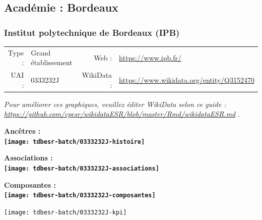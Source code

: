 \documentclass[12pt,french,]{article}
\begin{document}
\hypertarget{acaduxe9mie-bordeaux-1}{%
\subsection{Académie : Bordeaux}\label{acaduxe9mie-bordeaux-1}}

\hypertarget{institut-polytechnique-de-bordeaux-ipb}{%
\subsubsection{Institut polytechnique de Bordeaux
(IPB)}\label{institut-polytechnique-de-bordeaux-ipb}}

\begin{tabular*}{\textwidth}{rp{5cm}rl}  
\hline  
Type : & Grand établissement & Web : &\href{https://www.ipb.fr/}{https://www.ipb.fr/} \\  
UAI : & 0333232J & WikiData : & \href{https://www.wikidata.org/entity/Q3152470}{https://www.wikidata.org/entity/Q3152470} \\  
\hline  
\end{tabular*}

\textit{\scriptsize Pour améliorer ces graphiques, veuillez éditer WikiData selon ce guide :  \href{https://github.com/cpesr/wikidataESR/blob/master/Rmd/wikidataESR.md}{https://github.com/cpesr/wikidataESR/blob/master/Rmd/wikidataESR.md}}
.

\vspace{1cm}  
\begin{minipage}[b]{0.50\textwidth}\begin{center} \bf Ancêtres : \\  
\texttt{[image: tdbesr-batch/0333232J-histoire]} \end{center}\end{minipage}\begin{minipage}[b]{0.50\textwidth}\begin{center} \bf Associations : \\  
\texttt{[image: tdbesr-batch/0333232J-associations]} \end{center}\end{minipage}

\hrulefill

\begin{center} \bf Composantes : \\  
\texttt{[image: tdbesr-batch/0333232J-composantes]} \end{center}

\begin{center}\texttt{[image: tdbesr-batch/0333232J-kpi]} \end{center}\checkoddpage
\end{document}
